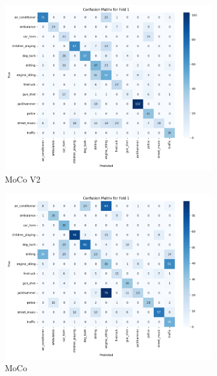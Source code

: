 \documentclass[11pt]{article}
\begin{document}
\begin{figure}[ht]
\begin{subfigure}[b]{0.24\textwidth}
        \includegraphics[width=\textwidth]{latex/assets/1-fold-1-epoch/confusion_matrix_mocov2.png}
        \caption{MoCo V2}
        \label{fig:cm_mocov2}
    \end{subfigure}
    \hfill
    \begin{subfigure}[b]{0.24\textwidth}
        \centering
        \includegraphics[width=\textwidth]{latex/assets/1-fold-1-epoch/confusion_matrix_moco.png}
        \caption{MoCo}
        \label{fig:cm_moco}
    \end{subfigure}
    \hfill
    \begin{subfigure}[b]{0.24\textwidth}

\end{subfigure}
\end{figure}
\end{document}

